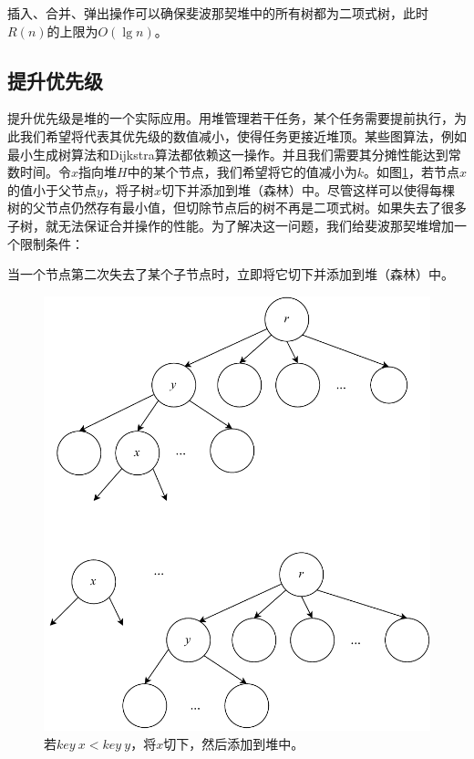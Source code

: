 \documentclass[b5paper]{ctexart}
\begin{document}
插入、合并、弹出操作可以确保斐波那契堆中的所有树都为二项式树，此时$R(n)$的上限为$O(\lg n)$。

\subsection{提升优先级}

提升优先级是堆的一个实际应用。用堆管理若干任务，某个任务需要提前执行，为此我们希望将代表其优先级的数值减小，使得任务更接近堆顶。某些图算法，例如最小生成树算法和Dijkstra算法都依赖这一操作\cite{CLRS}。并且我们需要其分摊性能达到常数时间。令$x$指向堆$H$中的某个节点，我们希望将它的值减小为$k$。如图\ref{fig:cut-fib-tree}，若节点$x$的值小于父节点$y$，将子树$x$切下并添加到堆（森林）中。尽管这样可以使得每棵树的父节点仍然存有最小值，但切除节点后的树不再是二项式树。如果失去了很多子树，就无法保证合并操作的性能。为了解决这一问题，我们给斐波那契堆增加一个限制条件：

\begin{center}当一个节点第二次失去了某个子节点时，立即将它切下并添加到堆（森林）中。
\end{center}

\begin{figure}[htbp]
  \centering
  \includegraphics[scale=0.5]{img/fib-cut-past}
  \caption{若$key\ x < key\ y$，将$x$切下，然后添加到堆中。}
  \label{fig:cut-fib-tree}
\end{figure}
\end{document}
